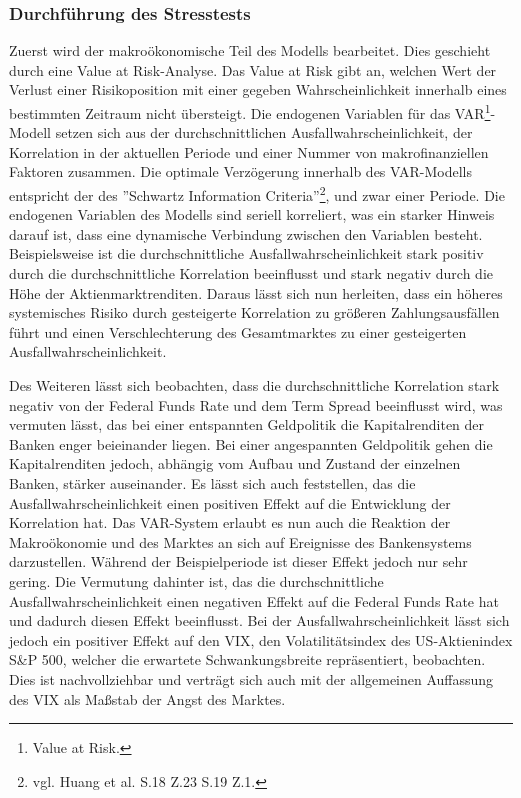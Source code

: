 \documentclass[a4paper,12pt]{scrartcl}
\begin{document}
\subsubsection{Durchführung des Stresstests}
Zuerst wird der makroökonomische Teil des Modells bearbeitet. Dies geschieht durch eine Value at Risk-Analyse. Das Value at Risk gibt an, welchen Wert der Verlust einer Risikoposition mit einer gegeben Wahrscheinlichkeit innerhalb eines bestimmten Zeitraum nicht übersteigt. 
Die endogenen Variablen für das VAR\footnote{Value at Risk.}-Modell setzen sich aus der durchschnittlichen Ausfallwahrscheinlichkeit, der Korrelation in der aktuellen Periode und einer Nummer von makrofinanziellen Faktoren zusammen. Die optimale Verzögerung innerhalb des VAR-Modells entspricht der des ''Schwartz Information Criteria''\footnote{vgl. Huang et al. S.18 Z.23 S.19 Z.1.}, und zwar einer Periode. Die endogenen Variablen des Modells sind seriell korreliert, was ein starker Hinweis darauf ist, dass eine dynamische Verbindung zwischen den Variablen besteht. Beispielsweise ist die durchschnittliche Ausfallwahrscheinlichkeit stark positiv durch die durchschnittliche Korrelation beeinflusst und stark negativ durch die Höhe der Aktienmarktrenditen.
Daraus lässt sich nun herleiten, dass ein höheres systemisches Risiko durch gesteigerte Korrelation zu größeren Zahlungsausfällen führt und einen Verschlechterung des Gesamtmarktes zu einer gesteigerten Ausfallwahrscheinlichkeit.

Des Weiteren lässt sich beobachten, dass die durchschnittliche Korrelation stark negativ von der Federal Funds Rate und dem Term Spread beeinflusst wird, was vermuten lässt, das bei einer entspannten Geldpolitik die Kapitalrenditen der Banken enger beieinander liegen. Bei einer angespannten Geldpolitik gehen die Kapitalrenditen jedoch, abhängig vom Aufbau und Zustand der einzelnen Banken, stärker auseinander.  
Es lässt sich auch feststellen, das die Ausfallwahrscheinlichkeit einen positiven Effekt auf die Entwicklung der Korrelation hat.
Das VAR-System erlaubt es nun auch die Reaktion der Makroökonomie und des Marktes an sich auf Ereignisse des Bankensystems darzustellen. Während der Beispielperiode ist dieser Effekt jedoch nur sehr gering. Die Vermutung dahinter ist, das die durchschnittliche Ausfallwahrscheinlichkeit einen negativen Effekt auf die Federal Funds Rate hat und dadurch diesen Effekt beeinflusst.
Bei der Ausfallwahrscheinlichkeit lässt sich jedoch ein positiver Effekt auf den VIX, den Volatilitätsindex des US-Aktienindex S\&P 500, welcher die erwartete Schwankungsbreite repräsentiert, beobachten. Dies ist nachvollziehbar und verträgt sich auch mit der allgemeinen Auffassung des VIX als Maßstab der Angst des Marktes. 
\end{document}

